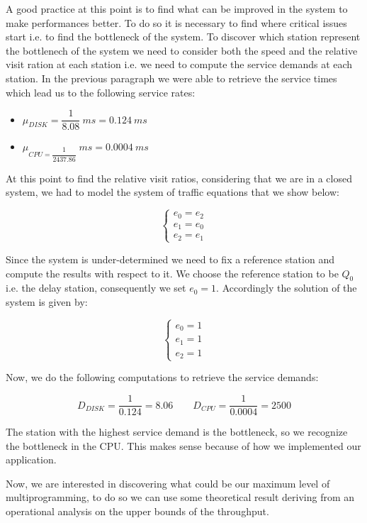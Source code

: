 \documentclass[11pt]{scrartcl} %
\begin{document}
A good practice at this point is  to find what can be improved in the system to make performances better. To do so it is necessary to find where critical issues start i.e. to find the bottleneck of the system. To discover which station represent the bottlenech of the system we need to consider both the speed and the relative  visit ration at each station i.e. we need to compute the service demands at each station. In the previous paragraph we were able to retrieve the service times which lead us  to the following service rates:

\begin{itemize}
\item[] $\mu_{DISK}=\dfrac{1}{8.08}\ ms=0.124\ ms$
\item[] $\mu_{CPU=\dfrac{1}{2437.86}}\ ms=0.0004\ ms$
\end{itemize}

At this point to find the relative visit ratios, considering that we are in a closed system, we had to model the system of traffic equations that we show below:

$$\begin{cases} e_0=e_2\\ e_1=e_0\\ e_2=e_1\end{cases}$$

Since the system is under-determined we need to fix a reference station and compute the  results with respect to it. We choose the reference station to  be $Q_0$ i.e. the  delay station, consequently we set $e_0 = 1$. Accordingly the solution of the system is given by:

$$\begin{cases} e_0=1\\ e_1=1\\ e_2=1\end{cases}$$

Now, we do the following  computations to retrieve the service demands:

$$D_{DISK}=\dfrac{1}{0.124}=8.06\qquad D_{CPU}=\dfrac{1}{0.0004}=2500$$

The station with the highest service demand is the bottleneck, so we recognize the bottleneck in the  CPU. This makes sense because of how we implemented our application.


Now, we are interested in discovering what could be our maximum level of multiprogramming, to do so we can use some theoretical result deriving from an operational  analysis on the upper bounds of the throughput.
\end{document}

